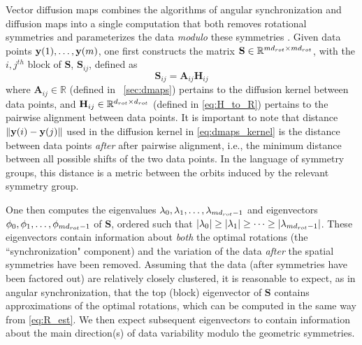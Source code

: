 Vector diffusion maps combines the algorithms of angular synchronization and diffusion maps into a single computation that both removes rotational symmetries and parameterizes the data {\em modulo} these symmetries \cite{singer2012vector}.
%
Given data points $\mathbf{y}(1), \dots, \mathbf{y}(m)$, one first constructs the matrix $\mathbf{S} \in \mathbb{R}^{m d_{rot} \times m d_{rot}}$, with the $i,j^{th}$ block of $\mathbf{S}$, $\mathbf{S}_{ij}$, defined as
\begin{equation} \label{eq:vdm_S}
	\mathbf{S}_{ij} = \mathbf{A}_{ij} \mathbf{H}_{ij}
\end{equation}
%
where $\mathbf{A}_{ij} \in \mathbb{R}$ (defined in \sec~\ref{sec:dmaps}) pertains to the diffusion kernel between data points, and $\mathbf{H}_{ij} \in \mathbb{R}^{d_{rot} \times d_{rot}}$ (defined in \eqref{eq:H_to_R}) pertains to the pairwise alignment between data points.
%
It is important to note that distance $\| \mathbf{y}(i) - \mathbf{y}(j) \|$ used in the diffusion kernel in \eqref{eq:dmaps_kernel} is the distance between data points {\it after} after pairwise alignment, i.e., the minimum distance between all possible shifts of the two data points.
%
In the language of symmetry groups, this distance is a metric between the orbits induced by the relevant symmetry group.

One then computes the eigenvalues $\lambda_0, \lambda_1, \dots, \lambda_{m d_{rot}-1}$ and eigenvectors $\phi_0, \phi_1, \dots, \phi_{m d_{rot}-1}$ of $\mathbf{S}$, ordered such that $|\lambda_0| \ge |\lambda_1| \ge \dots \ge |\lambda_{m d_{rot}-1}|$.
%
These eigenvectors contain information about {\it both} the optimal rotations (the ``synchronization" component) and the
variation of the data {\it after} the spatial symmetries have been removed.
%
Assuming that the data (after symmetries have been factored out) are relatively closely clustered, it is reasonable
to expect, as in angular synchronization, that the top (block) eigenvector of $\mathbf{S}$ contains approximations of the optimal rotations,
which can be computed in the same way from \eqref{eq:R_est}.
%
We then expect subsequent eigenvectors to contain information about the main direction(s) of data variability modulo the geometric symmetries.

